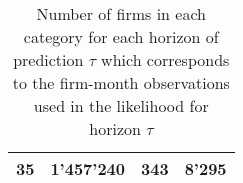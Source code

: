 \begin{table}[]
\begin{tabular}{l l l l}
35 &  1'457'240 & 343 & 8'295 \\
\hline
    \end{tabular}
    \caption{Number of firms in each category for each horizon of prediction $\tau$ which corresponds to the firm-month observations used in the likelihood for horizon $\tau$}
    \label{tab:observ}
\end{table}

